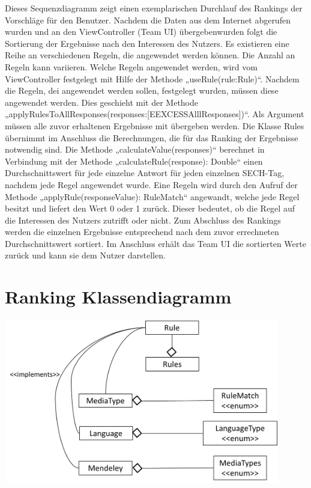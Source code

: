 Dieses Sequenzdiagramm zeigt einen exemplarischen Durchlauf des Rankings der Vorschläge für den Benutzer. Nachdem die Daten aus dem Internet abgerufen wurden und an den ViewController (Team UI) übergebenwurden folgt die Sortierung der Ergebnisse nach den Interessen des Nutzers. Es existieren eine Reihe an verschiedenen Regeln, die angewendet werden können. Die Anzahl an Regeln kann variieren. Welche Regeln angewendet werden, wird vom ViewController festgelegt mit Hilfe der Methode „useRule(rule:Rule)“. Nachdem die Regeln, dei angewendet werden sollen, festgelegt wurden, müssen diese angewendet werden. Dies geschieht mit der Methode „applyRulesToAllResponses(responses:[EEXCESSAlllResponses])“. Als Argument müssen alle zuvor erhaltenen Ergebnisse mit übergeben werden. Die Klasse Rules übernimmt im Anschluss die Berechnungen, die für das Ranking der Ergebnisse notwendig sind. Die Methode „calculateValue(responses)“ berechnet in Verbindung mit der Methode „calculateRule(response): Double“ einen Durchschnittswert für jede einzelne Antwort für jeden einzelnen SECH-Tag, nachdem jede Regel angewendet wurde. Eine Regeln wird durch den Aufruf der Methode „applyRule(responseValue): RuleMatch“ angewandt, welche jede Regel besitzt und liefert den Wert 0 oder 1 zurück. Dieser bedeutet, ob die Regel auf die Interessen des Nutzers zutrifft oder nicht. Zum Abschluss des Rankings werden die einzelnen Ergebnisse entsprechend nach dem zuvor errechneten Durchschnittswert sortiert. Im Anschluss erhält das Team UI die sortierten Werte zurück und kann sie dem Nutzer darstellen. 

\section{Ranking Klassendiagramm}

\includegraphics[width=12cm]{Pics/Klassendiagramm_Ranking}

